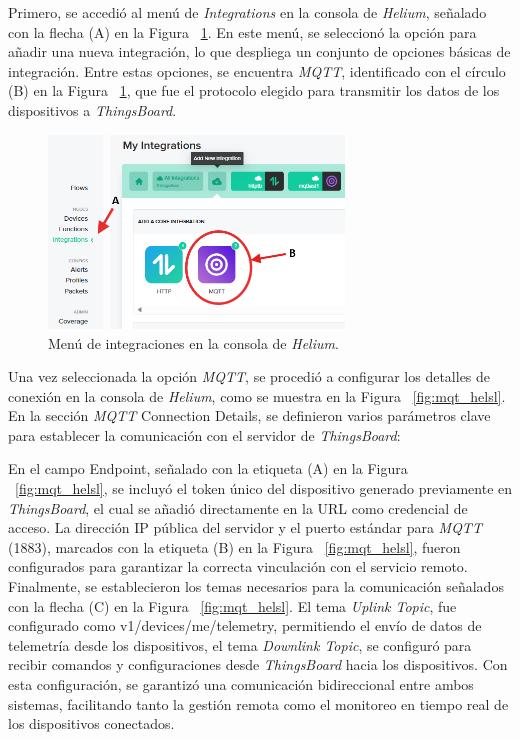 Primero, se accedió al menú de \textit{Integrations} en la consola de \textit{Helium}, señalado con la flecha (A) en la Figura ~\ref{fig:integra_hel}. En este menú, se seleccionó la opción para añadir una nueva integración, lo que despliega un conjunto de opciones básicas de integración. Entre estas opciones, se encuentra \textit{MQTT}, identificado con el círculo (B) en la Figura ~\ref{fig:integra_hel}, que fue el protocolo elegido para transmitir los datos de los dispositivos a \textit{ThingsBoard}.

\begin{figure}[H]
\leavevmode
\begin{minipage}{\textwidth}
\begin{center}
\includegraphics[width=0.7\textwidth]{./capitulo_04/imagen/tb2/hel_integr.png}
\caption{Menú de integraciones en la consola de \textit{Helium}. \label{fig:integra_hel}}
\end{center}
\end{minipage}
\end{figure}



Una vez seleccionada la opción \textit{MQTT}, se procedió a configurar los detalles de conexión en la consola de \textit{Helium}, como se muestra en la Figura ~\ref{fig:mqt_helsl}. En la sección \textit{MQTT} Connection Details, se definieron varios parámetros clave para establecer la comunicación con el servidor de \textit{ThingsBoard}:

En el campo Endpoint, señalado con la etiqueta (A) en la Figura ~\ref{fig:mqt_helsl}, se incluyó el token único del dispositivo generado previamente en \textit{ThingsBoard}, el cual se añadió directamente en la URL como credencial de acceso.
La dirección IP pública del servidor y el puerto estándar para \textit{MQTT} (1883), marcados con la etiqueta (B) en la Figura ~\ref{fig:mqt_helsl}, fueron configurados para garantizar la correcta vinculación con el servicio remoto.
Finalmente, se establecieron los temas necesarios para la comunicación señalados con la flecha (C) en la Figura ~\ref{fig:mqt_helsl}. El tema \textit{Uplink Topic}, fue configurado como v1/devices/me/telemetry, permitiendo el envío de datos de telemetría desde los dispositivos, el tema \textit{Downlink Topic}, se configuró para recibir comandos y configuraciones desde \textit{ThingsBoard} hacia los dispositivos.
Con esta configuración, se garantizó una comunicación bidireccional entre ambos sistemas, facilitando tanto la gestión remota como el monitoreo en tiempo real de los dispositivos conectados.


